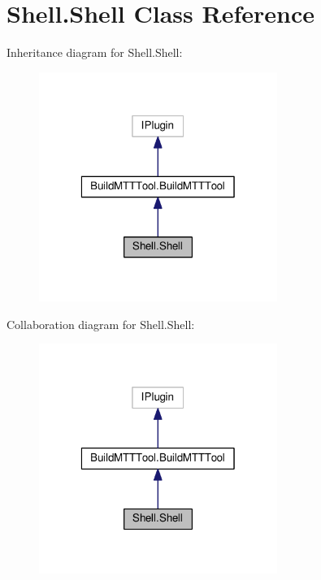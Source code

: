 \hypertarget{class_shell_1_1_shell}{\section{Shell.\-Shell Class Reference}
\label{class_shell_1_1_shell}
}


Inheritance diagram for Shell.\-Shell\-:
\nopagebreak
\begin{figure}[H]
\begin{center}
\leavevmode
\includegraphics[width=220pt]{class_shell_1_1_shell__inherit__graph}
\end{center}
\end{figure}


Collaboration diagram for Shell.\-Shell\-:
\nopagebreak
\begin{figure}[H]
\begin{center}
\leavevmode
\includegraphics[width=220pt]{class_shell_1_1_shell__coll__graph}
\end{center}
\end{figure}
